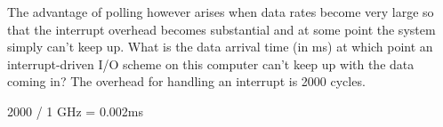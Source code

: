 \begin{blocksection}
\question
The advantage of polling however arises when data rates become very large so that the interrupt overhead becomes substantial and at some point the system simply can’t keep up. What is the data arrival time (in ms) at which point an interrupt-driven I/O scheme on this computer can’t keep up with the data coming in? The overhead for handling an interrupt is 2000 cycles. 
\begin{solution}[0.5in] 
2000 / 1 GHz = 0.002ms
\end{solution}

\end{blocksection}